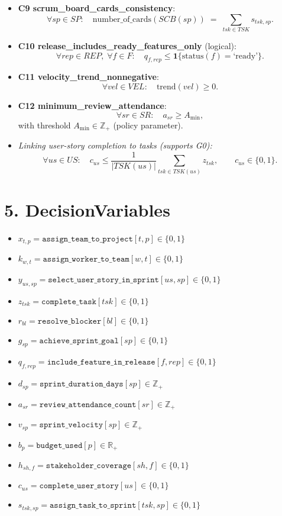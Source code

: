 \documentclass[11pt]{article}
\begin{document}
\begin{itemize}
  \item \textbf{C9 scrum\_board\_cards\_consistency}:
  \[
    \forall sp\in SP:\quad \text{number\_of\_cards}(SCB(sp)) \;=\; \sum_{tsk\in TSK} s_{tsk,sp}.
  \]

  \item \textbf{C10 release\_includes\_ready\_features\_only} (logical):
  \[
    \forall rep\in REP,\;\forall f\in F:\quad q_{f,rep}\le \mathbf{1}\{\text{status}(f)=\text{`ready'}\}.
  \]

  \item \textbf{C11 velocity\_trend\_nonnegative}:
  \[
    \forall vel\in VEL:\quad \text{trend}(vel)\ge 0.
  \]

  \item \textbf{C12 minimum\_review\_attendance}:
  \[
    \forall sr\in SR:\quad a_{sr}\ge A_{\min},
  \]
  with threshold $A_{\min}\in\mathbb{Z}_+$ (policy parameter).
  
  \item \textit{Linking user-story completion to tasks (supports G0):}
  \[
    \forall us\in US:\quad c_{us}\le \frac{1}{|TSK(us)|}\sum_{tsk\in TSK(us)} z_{tsk},\qquad c_{us}\in\{0,1\}.
  \]
\end{itemize}

\section{5. DecisionVariables}
\begin{itemize}
  \item $x_{t,p}=\texttt{assign\_team\_to\_project}[t,p]\in\{0,1\}$
  \item $k_{w,t}=\texttt{assign\_worker\_to\_team}[w,t]\in\{0,1\}$
  \item $y_{us,sp}=\texttt{select\_user\_story\_in\_sprint}[us,sp]\in\{0,1\}$
  \item $z_{tsk}=\texttt{complete\_task}[tsk]\in\{0,1\}$
  \item $r_{bl}=\texttt{resolve\_blocker}[bl]\in\{0,1\}$
  \item $g_{sp}=\texttt{achieve\_sprint\_goal}[sp]\in\{0,1\}$
  \item $q_{f,rep}=\texttt{include\_feature\_in\_release}[f,rep]\in\{0,1\}$
  \item $d_{sp}=\texttt{sprint\_duration\_days}[sp]\in\mathbb{Z}_+$
  \item $a_{sr}=\texttt{review\_attendance\_count}[sr]\in\mathbb{Z}_+$
  \item $v_{sp}=\texttt{sprint\_velocity}[sp]\in\mathbb{Z}_+$
  \item $b_{p}=\texttt{budget\_used}[p]\in\mathbb{R}_+$
  \item $h_{sh,f}=\texttt{stakeholder\_coverage}[sh,f]\in\{0,1\}$
  \item $c_{us}=\texttt{complete\_user\_story}[us]\in\{0,1\}$
  \item $s_{tsk,sp}=\texttt{assign\_task\_to\_sprint}[tsk,sp]\in\{0,1\}$
\end{itemize}
\end{document}

